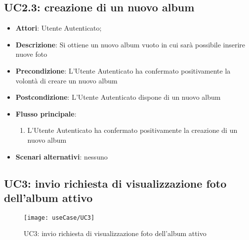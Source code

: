 
\subsection{UC2.3: creazione di un nuovo album}
\label{uc:uc2.3}

\begin{itemize}
  \item \textbf{Attori}: Utente Autenticato;
  \item \textbf{Descrizione}: Si ottiene un nuovo album vuoto in cui sarà
possibile inserire nuove foto
  \item \textbf{Precondizione}: L'Utente Autenticato ha confermato
positivamente la volontà di creare un nuovo album
  \item \textbf{Postcondizione}: L'Utente Autenticato dispone di un nuovo album
  \item \textbf{Flusso principale}:
  \begin{enumerate}
    \item L'Utente Autenticato ha confermato positivamente la creazione di un
nuovo album
  \end{enumerate}
  \item \textbf{Scenari alternativi}: nessuno
\end{itemize}



\newpage

\subsection{UC3: invio richiesta di visualizzazione foto dell'album attivo}
\label{uc:uc3}


\begin{figure}[H]
  \centering
  \texttt{[image: useCase/UC3]}
  \caption{UC3: invio richiesta di visualizzazione foto dell'album attivo}
\end{figure}

